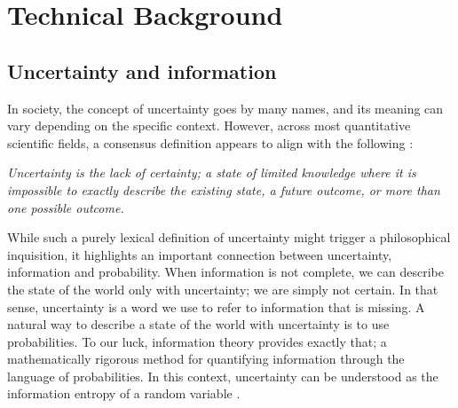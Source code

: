 

\chapter[technical background]{Technical Background}\label{chp:technical-background}

\section{Uncertainty and information}


In society, the concept of uncertainty goes by many names, and its meaning can vary depending on the specific context. However, across most quantitative scientific fields, a consensus definition appears to align with the following \cite{hubbard_how_2014}:
%
\begin{center}
    \textit{Uncertainty is the lack of certainty; a state of limited knowledge where it is impossible to exactly describe the existing state, a future outcome, or more than one possible outcome.}
\end{center}
%
While such a purely lexical definition of uncertainty might trigger a philosophical inquisition, it highlights an important connection between uncertainty, information and probability. When information is not complete, we can describe the state of the world only with uncertainty; we are simply not certain. In that sense, uncertainty is a word we use to refer to information that is missing. A natural way to describe a state of the world with uncertainty is to use probabilities. To our luck, information theory provides exactly that; a mathematically rigorous method for quantifying information through the language of probabilities. In this context, uncertainty can be understood as the information entropy of a random variable \cite{mackay_information_2003}. 


